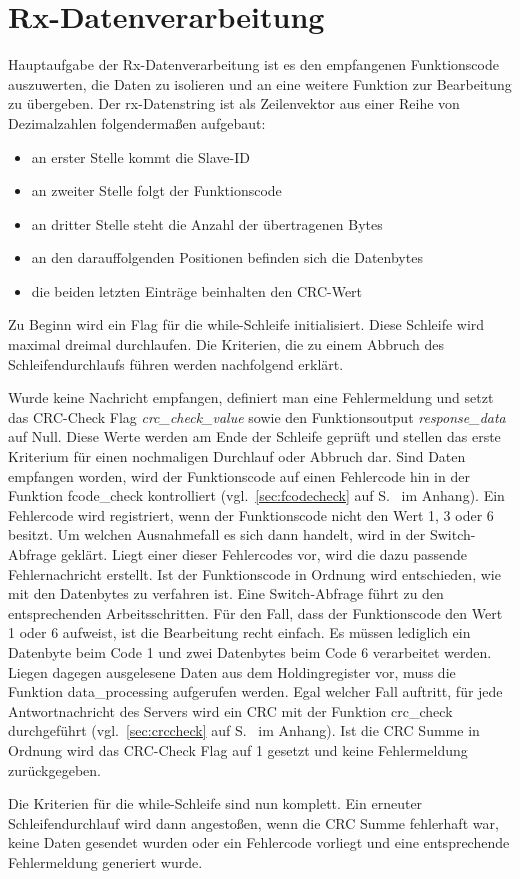 \section{Rx-Datenverarbeitung}\label{sec:rxdatenverarbeitung}
Hauptaufgabe der Rx-Datenverarbeitung ist es den empfangenen Funktionscode auszuwerten, die Daten zu isolieren und an eine weitere Funktion zur Bearbeitung zu übergeben. Der rx-Datenstring ist als Zeilenvektor aus einer Reihe von Dezimalzahlen folgendermaßen aufgebaut:
\begin{itemize}
\item an erster Stelle kommt die Slave-ID 
\item an zweiter Stelle folgt der Funktionscode 
\item an dritter Stelle steht die Anzahl der übertragenen Bytes
\item an den darauffolgenden Positionen befinden sich die Datenbytes
\item die beiden letzten Einträge beinhalten den CRC-Wert
\end{itemize}
Zu Beginn wird ein Flag für die while-Schleife initialisiert. Diese Schleife wird maximal dreimal durchlaufen. Die Kriterien, die zu einem Abbruch des Schleifendurchlaufs führen werden nachfolgend erklärt.

Wurde keine Nachricht empfangen, definiert man eine Fehlermeldung und setzt das CRC-Check Flag \textit{crc\_check\_value} sowie den Funktionsoutput \textit{response\_data} auf Null. Diese Werte werden am Ende der Schleife geprüft und stellen das erste Kriterium für einen nochmaligen Durchlauf oder Abbruch dar. Sind Daten empfangen worden, wird der Funktionscode auf einen Fehlercode hin in der Funktion \textsf{fcode\_check} kontrolliert (vgl.~\ref{sec:fcodecheck} auf S.~\pageref{sec:fcodecheck} im Anhang). Ein Fehlercode wird registriert, wenn der Funktionscode nicht den Wert 1, 3 oder 6 besitzt. Um welchen Ausnahmefall es sich dann handelt, wird in der Switch-Abfrage geklärt. Liegt einer dieser Fehlercodes vor, wird die dazu passende Fehlernachricht erstellt. Ist der Funktionscode in Ordnung wird entschieden, wie mit den Datenbytes zu verfahren ist. Eine Switch-Abfrage führt zu den entsprechenden Arbeitsschritten. Für den Fall, dass der Funktionscode den Wert 1 oder 6 aufweist, ist die Bearbeitung recht einfach. Es müssen lediglich ein Datenbyte beim Code 1 und zwei Datenbytes beim Code 6 verarbeitet werden. Liegen dagegen ausgelesene Daten aus dem Holdingregister vor, muss die Funktion \textsf{data\_processing} aufgerufen werden. Egal welcher Fall auftritt, für jede Antwortnachricht des Servers wird ein CRC mit der Funktion \textsf{crc\_check} durchgeführt (vgl.~\ref{sec:crccheck} auf S.~\pageref{sec:crccheck} im Anhang). Ist die CRC Summe in Ordnung wird das CRC-Check Flag auf 1 gesetzt und keine Fehlermeldung zurückgegeben.

Die Kriterien für die while-Schleife sind nun komplett. Ein erneuter Schleifendurchlauf wird dann angestoßen, wenn die CRC Summe fehlerhaft war, keine Daten gesendet wurden oder ein Fehlercode vorliegt und eine entsprechende Fehlermeldung generiert wurde.      

